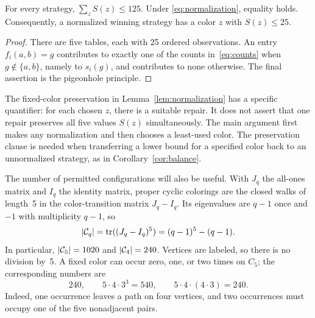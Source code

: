 \begin{lemma}\label{lem:total}
For every strategy, $\sum_zS(z)\leq125$. Under
\eqref{eq:normalization}, equality holds. Consequently, a normalized
winning strategy has a color $z$ with $S(z)\leq25$.
\end{lemma}
\begin{proof}
There are five tables, each with 25 ordered observations. An entry
$f_i(a,b)=g$ contributes to exactly one of the counts in~\eqref{eq:counts}
when $g\notin\{a,b\}$, namely to $s_i(g)$, and contributes to none
otherwise. The final assertion is the pigeonhole principle.
\end{proof}

The fixed-color preservation in Lemma~\ref{lem:normalization} has a
specific quantifier: for each chosen $z$, there is a suitable repair.
It does not assert that one repair preserves all five values $S(z)$
simultaneously. The main argument first makes any normalization and then
chooses a least-used color. The preservation clause is needed when
transferring a lower bound for a specified color back to an unnormalized
strategy, as in Corollary~\ref{cor:balance}.

The number of permitted configurations will also be useful. With $J_q$
the all-ones matrix and $I_q$ the identity matrix, proper cyclic colorings
are the closed walks of length~5 in the color-transition matrix $J_q-I_q$.
Its eigenvalues are $q-1$ once and $-1$ with multiplicity $q-1$, so
\begin{equation}\label{eq:configuration-count}
|\mathcal{C}_q|=\operatorname{tr}((J_q-I_q)^5)=(q-1)^5-(q-1).
\end{equation}
In particular, $|\mathcal{C}_5|=1020$ and $|\mathcal{C}_4|=240$. Vertices are labeled,
so there is no division by~5. A fixed color can occur zero, one, or two
times on $C_5$; the corresponding numbers are
\begin{equation}\label{eq:layers}
240,\qquad 5\cdot4\cdot3^3=540,\qquad5\cdot4\cdot(4\cdot3)=240.
\end{equation}
Indeed, one occurrence leaves a path on four vertices, and two occurrences
must occupy one of the five nonadjacent pairs.

